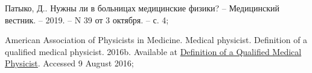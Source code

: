 \documentclass[a4paper,10pt]{extarticle}
\begin{document}
\begin{thebibliography}{99}
Патыко, Д.. Нужны ли в больницах медицинские физики? -- Медицинский вестник. -- 2019. -- N 39 от 3 октября. -- с. 4;

American Association of Physicists in Medicine. Medical physicist. Definition of a qualified medical physicist. 2016b. Available at \href{https://w3.aapm.org/medical_physicist/fields.php}{Definition of a Qualified Medical Physicist}. Accessed 9 August 2016;


 

\end{thebibliography}

\end{document}
